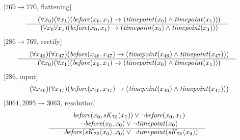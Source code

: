 \documentclass[border=10pt,preview,multi,varwidth=\maxdimen]{standalone}
\newenvironment{VampireStep}{}{}
\newenvironment{VampireInference}{%
   \begin{array}{c}}{\end{array}}
\newenvironment{VampirePremise}%
   {\begin{array}{l}}%
   {\end{array}}
\newenvironment{VampireConclusion}%
   {\begin{array}{l}}%
   {\end{array}}
\newcommand{\VPremiseSeparator}{\\}
\newcommand{\VConclusionSeparator}{\\ \hline}
\newcommand{\Vor}{\vee}
\newcommand{\Vand}{\wedge}
\newcommand{\Vimp}{\rightarrow}
\begin{document}
\begin{VampireStep}
[$769\rightarrow 770$, flattening]\\
\[\begin{VampireInference}
\begin{VampirePremise}%
~~(\forall x_{0} )(\forall x_{1} )(\mathit{before} (x_{0},x_{1}) \Vimp (\mathit{timepoint} (x_{0}) \Vand \mathit{timepoint} (x_{1})))
\end{VampirePremise}
\VConclusionSeparator
\begin{VampireConclusion}
~~(\forall x_{0} \forall x_{1} )(\mathit{before} (x_{0},x_{1}) \Vimp (\mathit{timepoint} (x_{0}) \Vand \mathit{timepoint} (x_{1})))
\end{VampireConclusion}
\end{VampireInference}
\]
\end{VampireStep}
\begin{VampireStep}
[$286\rightarrow 769$, rectify]\\
\[\begin{VampireInference}
\begin{VampirePremise}%
~~(\forall x_{46} )(\forall x_{47} )(\mathit{before} (x_{46},x_{47}) \Vimp (\mathit{timepoint} (x_{46}) \Vand \mathit{timepoint} (x_{47})))
\end{VampirePremise}
\VConclusionSeparator
\begin{VampireConclusion}
~~(\forall x_{0} )(\forall x_{1} )(\mathit{before} (x_{0},x_{1}) \Vimp (\mathit{timepoint} (x_{0}) \Vand \mathit{timepoint} (x_{1})))
\end{VampireConclusion}
\end{VampireInference}
\]
\end{VampireStep}
\begin{VampireStep}
[$286$, input]\\
\[\begin{VampireInference}
\begin{VampireConclusion}
~~(\forall x_{46} )(\forall x_{47} )(\mathit{before} (x_{46},x_{47}) \Vimp (\mathit{timepoint} (x_{46}) \Vand \mathit{timepoint} (x_{47})))
\end{VampireConclusion}
\end{VampireInference}
\]
\end{VampireStep}
\begin{VampireStep}
[$3061,2095\rightarrow 3063$, resolution]\\
\[\begin{VampireInference}
\begin{VampirePremise}%
~~\mathit{before} (x_{0},\mathit{sK_{72}} (x_{1})) \Vor \neg \mathit{before} (x_{0},x_{1})
\end{VampirePremise}
\VPremiseSeparator
\begin{VampirePremise}%
~~\neg \mathit{before} (x_{0},x_{0}) \Vor \neg \mathit{timepoint} (x_{0})
\end{VampirePremise}
\VConclusionSeparator
\begin{VampireConclusion}
~~\neg \mathit{before} (\mathit{sK_{72}} (x_{0}),x_{0}) \Vor \neg \mathit{timepoint} (\mathit{sK_{72}} (x_{0}))
\end{VampireConclusion}
\end{VampireInference}
\]
\end{VampireStep}
\end{document}
